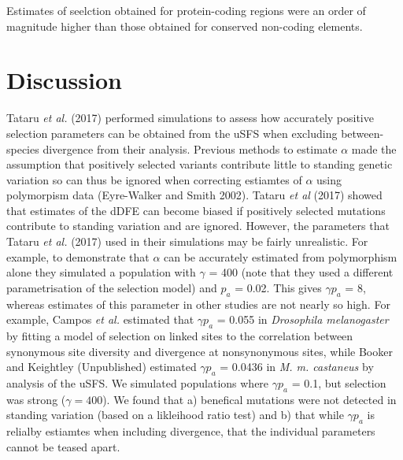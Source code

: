 \documentclass[11pt]{article}
\begin{document}
Estimates of seelction obtained for protein-coding regions were an order of magnitude higher than those obtained for conserved non-coding elements. 




%
%

\section*{Discussion}



Tataru \textit{et al.} (2017) performed simulations to assess how accurately positive selection parameters can be obtained from the uSFS when excluding between-species divergence from their analysis. Previous methods to estimate $\alpha$ made the assumption that positively selected variants contribute little  to standing genetic variation so can thus be ignored when correcting estiamtes of $\alpha$ using polymorpism data (Eyre-Walker and Smith 2002). Tataru \textit{et al} (2017) showed  that estimates of the dDFE can become biased if positively selected mutations contribute to standing variation and are ignored. However, the parameters that Tataru \textit{et al.} (2017) used in their simulations may be fairly unrealistic. For example, to demonstrate that $\alpha$ can be accurately estimated from polymorphism alone they simulated a population with $\gamma$ = 400 (note that they used a different parametrisation of the selection model) and $p_a$ = 0.02. This gives $\gamma p_a$ = 8, whereas estimates of this parameter in other studies are not nearly so high. For example, Campos \textit{et al.} estimated that $\gamma p_a$ = 0.055 in \textit{Drosophila melanogaster} by fitting a model of selection on linked sites to the correlation between synonymous site diversity and divergence at nonsynonymous sites, while Booker and Keightley (Unpublished) estimated $\gamma p_a$ = 0.0436 in \textit{M. m. castaneus} by analysis of the uSFS. We simulated populations where $\gamma p_a$ = 0.1, but selection was strong ($\gamma = 400$). We found that a) benefical mutations were not detected in standing variation (based on a likleihood ratio test) and b) that while $\gamma p_a$ is relialby estiamtes when including divergence, that the individual parameters cannot be teased apart. 
\end{document}
